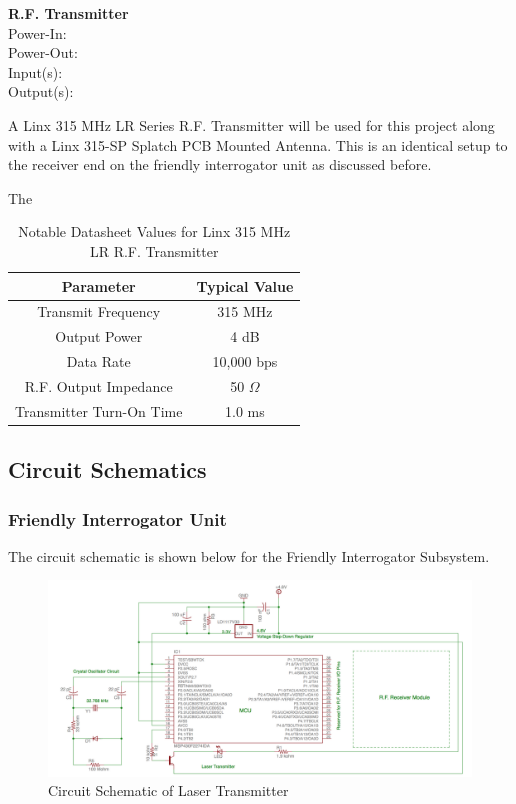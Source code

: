 \documentclass[letterpaper,10pt]{article}
\begin{document}
\begin{spacing}{1.15}
\normalsize\textbf{R.F. Transmitter}\\
Power-In: \\
Power-Out: \\ 
Input(s): \\ 
Output(s):

A Linx 315 MHz LR Series R.F. Transmitter will be used for this project along with a Linx 315-SP Splatch PCB Mounted Antenna. This is an identical setup to the receiver end on the friendly interrogator unit as discussed before. 

The 

\begin{table}[htbp]
	\centering
	\begin{tabular}{c|c}	%
		\toprule	%
		Parameter & Typical Value \\
		\midrule
		Transmit Frequency & 315 MHz \\ 
		Output Power & 4 dB \\
		Data Rate & 10,000 bps \\
		R.F. Output Impedance & 50 $\Omega$ \\
		Transmitter Turn-On Time & 1.0 ms  \\
		\bottomrule	%
	\end{tabular}%
	\caption{Notable Datasheet Values for Linx 315 MHz LR R.F. Transmitter}
	\label{tab:table2}	%
\end{table}



\subsection{Circuit Schematics}

\subsubsection{Friendly Interrogator Unit}
The circuit schematic is shown below for the Friendly Interrogator Subsystem.
\begin{figure} [H]
	\centering
	\includegraphics[scale=0.45]{Circuit_Schematic.png}
	\caption{Circuit Schematic of Laser Transmitter\label{fig:circuit-schematic}}
\end{figure}


\end{spacing}
\end{document}
